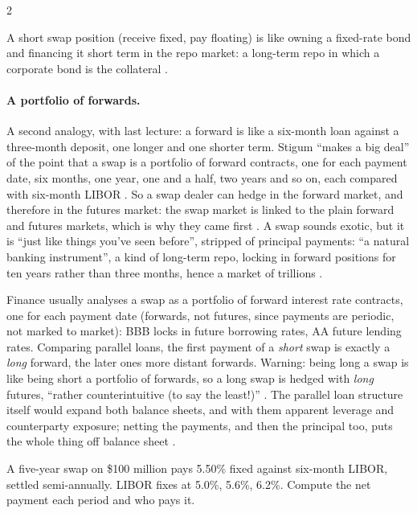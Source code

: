 \begin{paracol}{2}
\begin{intuition}
A short swap position (receive fixed, pay floating) is like owning a fixed-rate bond and financing it short term in the repo market: a long-term repo in which a
corporate bond is the collateral .
\end{intuition}

\paragraph{A portfolio of forwards.} A second analogy, with last lecture: a forward is like a six-month loan against a three-month deposit, one longer and one shorter term. Stigum ``makes a big deal'' of the point that a swap is a portfolio of forward contracts, one for each payment date, six months, one year, one and a half, two years and so on, each compared with six-month LIBOR . So a swap dealer can hedge in the forward market, and therefore in the futures market: the swap market is linked to the plain forward and futures markets, which is why they came first . A swap sounds exotic, but it is ``just like things you've seen before'', stripped of principal payments: ``a natural banking instrument'', a kind of long-term repo, locking in forward positions for ten years rather than three months, hence a market of trillions .

\begin{intuition}
Finance usually analyses a swap as a portfolio of forward interest rate contracts, one for each payment date (forwards, not futures, since payments are periodic, not marked to market): BBB
locks in future borrowing rates, AA future lending rates. Comparing parallel loans, the first payment of a \emph{short} swap is exactly a \emph{long} forward, the later ones more distant forwards.
Warning: being long a swap is like being short a portfolio of forwards, so a long swap is hedged with \emph{long} futures, ``rather counterintuitive (to say the least!)'' . The parallel loan
structure itself would expand both balance sheets, and with them apparent leverage and counterparty exposure; netting the payments, and then the principal too, puts the whole thing off balance
sheet .
\end{intuition}

\begin{exercise}
A five-year swap on \$100 million pays 5.50\% fixed against six-month LIBOR, settled semi-annually. LIBOR fixes at 5.0\%, 5.6\%, 6.2\%. Compute the net payment
each period and who pays it.
\end{exercise}


\end{paracol}
